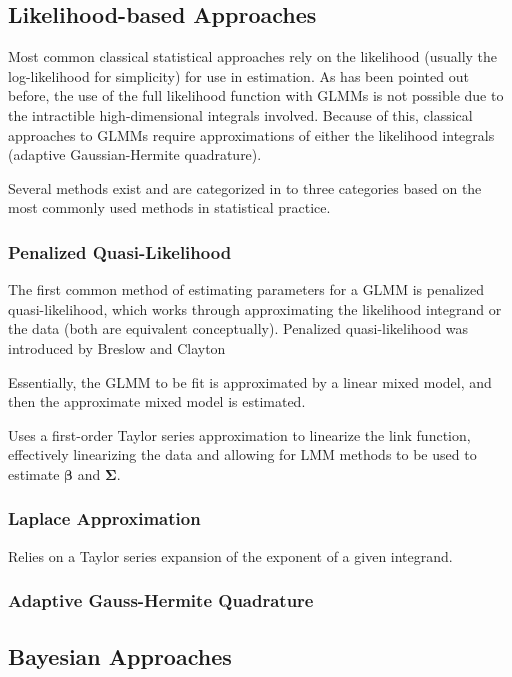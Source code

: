 \documentclass{article}\usepackage[]{graphicx}\usepackage[]{color}
\newcommand{\mb}[1]{$\bm{#1}$}
\begin{document}
\subsection{Likelihood-based Approaches}

Most common classical statistical approaches rely on the likelihood (usually the log-likelihood for simplicity) for use in estimation. As has been pointed out before, the use of the full likelihood function with GLMMs is not possible due to the intractible high-dimensional integrals involved. Because of this, classical approaches to GLMMs require approximations of either the likelihood integrals (adaptive Gaussian-Hermite quadrature). 

Several methods exist and are categorized in to three categories based on the most commonly used methods in statistical practice. 

\subsubsection{Penalized Quasi-Likelihood}

The first common method of estimating parameters for a GLMM is penalized quasi-likelihood, which works through approximating the likelihood integrand or the data (both are equivalent conceptually). Penalized quasi-likelihood was introduced by Breslow and Clayton 

Essentially, the GLMM to be fit is approximated by a linear mixed model, and then the approximate mixed model is estimated.

Uses a first-order Taylor series approximation to linearize the link function, effectively linearizing the data and allowing for LMM methods to be used to estimate \mb{\beta} and \mb{\Sigma}. 

\subsubsection{Laplace Approximation}

Relies on a Taylor series expansion of the exponent of a given integrand.

\subsubsection{Adaptive Gauss-Hermite Quadrature}



\subsection{Bayesian Approaches}
\end{document}
